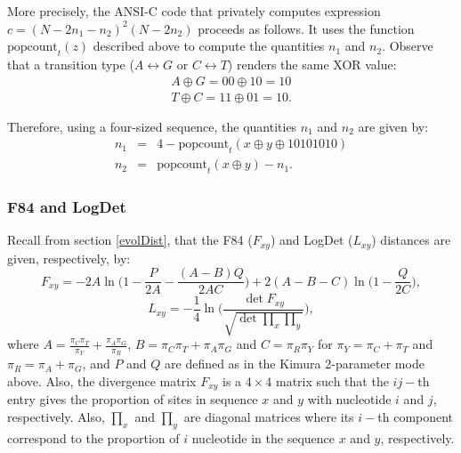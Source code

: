 More precisely, the ANSI-C code that privately computes expression $c = (N-2n_1-n_2)^2(N-2n_2)$ proceeds as follows. It uses the function $\text{popcount}_t(z)$ described above to compute the quantities $n_1$ and $n_2$. Observe that a transition type ($A\leftrightarrow G$ or $C\leftrightarrow T$) renders the same XOR value:
\begin{eqnarray*}
A \oplus G = 00 \oplus 10 = 10  \\
T \oplus C = 11 \oplus 01 = 10 .  
\end{eqnarray*}

Therefore, using a four-sized sequence, the quantities $n_1$ and $n_2$ are given by:
\begin{eqnarray*}
n_1 &=& 4 - \text{popcount}_t(x\oplus y\oplus 10101010)\\
n_2 &=& \text{popcount}_t(x\oplus y) - n_1.
\end{eqnarray*}





\subsubsection{F84 and LogDet}
Recall from section \ref{evolDist}, that the F84 ($F_{xy} $) and LogDet ($L_{xy} $) distances are given, respectively, by:
\begin{equation}
    F_{xy} = -2 A\ln\bigg( 1- \frac{P}{2A} - \frac{(A-B)Q}{2AC} \bigg) + 2(A-B-C)\ln\bigg( 1-\frac{Q}{2C} \bigg),
\label{eq:F84_distance}
\end{equation}
\begin{equation}
    L_{xy} = -\frac{1}{4}\ln\Bigg( \frac{\det F_{xy}}{\sqrt{\det \prod_x \prod_y}} \Bigg),
\label{eq:LogDet_distance}
\end{equation}
where $A = \frac{\pi_C \pi_T}{\pi_Y} + \frac{\pi_A \pi_G}{\pi_R}$, $B=\pi_C\pi_T + \pi_A\pi_G$ and $C=\pi_R\pi_Y$ for $\pi_Y = \pi_C + \pi_T$ and $\pi_R = \pi_A + \pi_G$, and $P$ and $Q$ are defined as in the Kimura 2-parameter mode above. Also, the divergence matrix $F_{xy}$ is a $4\times 4$ matrix such that the $ij-$th entry gives the proportion of sites in sequence $x$ and $y$ with nucleotide $i$ and $j$, respectively. Also, $\prod_x$ and $\prod_y$ are diagonal matrices where its $i-$th component correspond to the proportion of $i$ nucleotide in the sequence $x$ and $y$, respectively.

